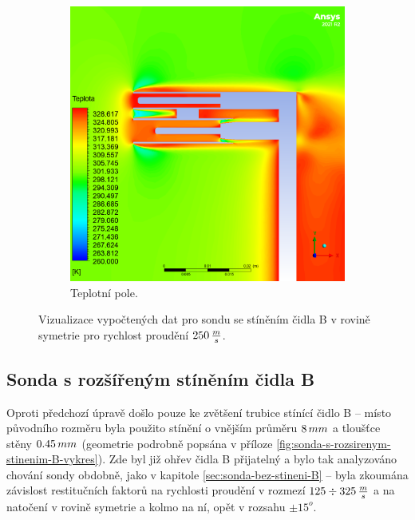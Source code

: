 \begin{figure}[ht!]
\begin{subfigure}{0.45\textwidth}
                \includegraphics[width=\textwidth]{400_SIMULACE_KONSTRUKCNICH_UPRAV/Vizualizace/sonda_se_stinenim_B_vizualizace_teplota.png}
                \caption{Teplotní pole.}
            \end{subfigure}
            \caption{Vizualizace vypočtených dat pro sondu se stíněním čidla B v rovině symetrie pro rychlost proudění $250 \, \frac{m}{s}$.}
            \label{fig:sonda-se-stinenim-B-vizualizace}
        \end{figure}
    
    \newpage
    \subsection{Sonda s rozšířeným stíněním čidla B} \label{sec:sonda-s-rozsirenym-stinenim-B}
        Oproti předchozí úpravě došlo pouze ke zvětšení trubice stínící čidlo B – místo původního rozměru byla použito stínění o vnějším průměru $8 \, mm$ a tloušťce stěny $0.45 \, mm$ (geometrie podrobně popsána v příloze \ref{fig:sonda-s-rozsirenym-stinenim-B-vykres}). Zde byl již ohřev čidla B přijatelný a bylo tak analyzováno chování sondy obdobně, jako v kapitole \ref{sec:sonda-bez-stineni-B} – byla zkoumána závislost restitučních faktorů na rychlosti proudění v rozmezí $125 \div 325 \, \frac{m}{s}$ a na natočení v rovině symetrie a kolmo na ní, opět v rozsahu $\pm 15^o$.
        

